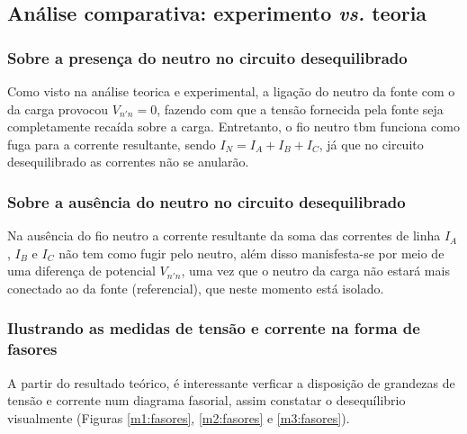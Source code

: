 \documentclass[a4paper,12pt,oneside,openany,table,xcdraw]{article}
\begin{document}
\vspace{0.2cm}

\subsection{Análise comparativa: experimento \emph{vs.} teoria}
\subsubsection{Sobre a presença do neutro no circuito desequilibrado}
Como visto na análise teorica e experimental, a ligação do neutro da fonte com o da carga provocou $V_{n'n}=0$, fazendo com que a tensão fornecida pela fonte seja completamente recaída sobre a carga. Entretanto, o fio neutro tbm funciona como fuga para a corrente resultante, sendo $I_N=I_A+I_B+I_C$, já que no circuito desequilibrado as correntes não se anularão. 

\subsubsection{Sobre a ausência do neutro no circuito desequilibrado}
Na ausência do fio neutro a corrente resultante da soma das correntes de linha $I_A$, $I_B$ e $I_C$ não tem como fugir pelo neutro, além disso manisfesta-se por meio de uma diferença de potencial $V_{n'n}$, uma vez que o neutro da carga não estará mais conectado ao da fonte (referencial), que neste momento está isolado.

\subsubsection{Ilustrando as medidas de tensão e corrente na forma de fasores}
A partir do resultado teórico, é interessante verficar a disposição de grandezas de tensão e corrente num diagrama fasorial, assim constatar o desequílibrio visualmente (Figuras \ref{m1:fasores}, \ref{m2:fasores} e \ref{m3:fasores}).
\end{document}
